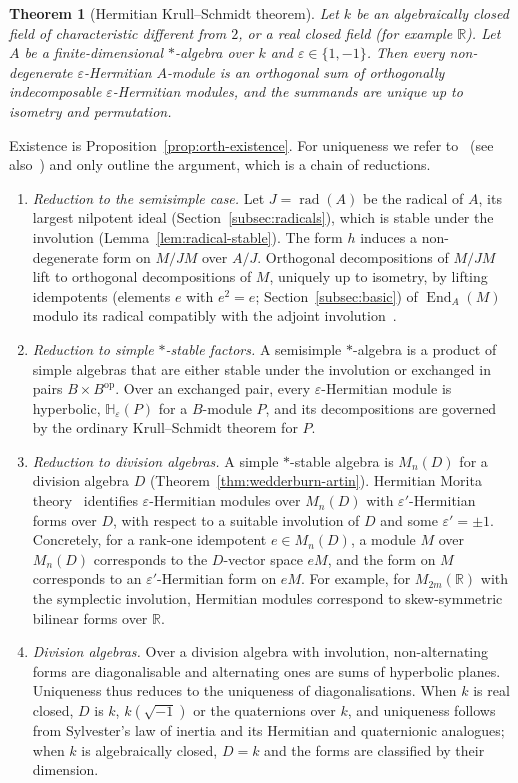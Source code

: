 \documentclass[12pt, a4paper]{report}
\theoremstyle{plain}
\newtheorem{theorem}{Theorem}[chapter]
\theoremstyle{definition}
\theoremstyle{remark}
\theoremstyle{plain}
\newcommand{\rad}[0]{\operatorname{rad}} %
\newcommand{\RR}{\mathbb{R}}
\DeclareMathOperator{\End}{End}
\begin{document}
\begin{theorem}[Hermitian Krull--Schmidt theorem]\label{thm:hermitian-ks}
Let $k$ be an algebraically closed field of characteristic different from $2$, or a real closed field (for example $\RR$). Let $A$ be a finite-dimensional $*$-algebra over $k$ and $\varepsilon\in\{1,-1\}$. Then every non-degenerate $\varepsilon$-Hermitian $A$-module is an orthogonal sum of orthogonally indecomposable $\varepsilon$-Hermitian modules, and the summands are unique up to isometry and permutation.
\end{theorem}

Existence is Proposition~\ref{prop:orth-existence}. For uniqueness we refer to~\cite{QuebbemannScharlauSchulte1979,Sergeichuk1988} (see also~\cite{Wall1976,Knus1991,Lorand2020}) and only outline the argument, which is a chain of reductions.
\begin{enumerate}
  \item \emph{Reduction to the semisimple case.} Let $J=\rad(A)$ be the radical of $A$, its largest nilpotent ideal (Section~\ref{subsec:radicals}), which is stable under the involution (Lemma~\ref{lem:radical-stable}). The form $h$ induces a non-degenerate form on $M/JM$ over $A/J$. Orthogonal decompositions of $M/JM$ lift to orthogonal decompositions of $M$, uniquely up to isometry, by lifting idempotents (elements $e$ with $e^2=e$; Section~\ref{subsec:basic}) of $\End_A(M)$ modulo its radical compatibly with the adjoint involution~\cite{QuebbemannScharlauSchulte1979}.
  \item \emph{Reduction to simple $*$-stable factors.} A semisimple $*$-algebra is a product of simple algebras that are either stable under the involution or exchanged in pairs $B\times B^{\mathrm{op}}$. Over an exchanged pair, every $\varepsilon$-Hermitian module is hyperbolic, $\mathbb{H}_\varepsilon(P)$ for a $B$-module $P$, and its decompositions are governed by the ordinary Krull--Schmidt theorem for $P$.
  \item \emph{Reduction to division algebras.} A simple $*$-stable algebra is $M_n(D)$ for a division algebra $D$ (Theorem~\ref{thm:wedderburn-artin}). Hermitian Morita theory~\cite[Ch.~I, \S9]{Knus1991} identifies $\varepsilon$-Hermitian modules over $M_n(D)$ with $\varepsilon'$-Hermitian forms over $D$, with respect to a suitable involution of $D$ and some $\varepsilon'=\pm1$. Concretely, for a rank-one idempotent $e\in M_n(D)$, a module $M$ over $M_n(D)$ corresponds to the $D$-vector space $eM$, and the form on $M$ corresponds to an $\varepsilon'$-Hermitian form on $eM$. For example, for $M_{2m}(\RR)$ with the symplectic involution, Hermitian modules correspond to skew-symmetric bilinear forms over $\RR$.
  \item \emph{Division algebras.} Over a division algebra with involution, non-alternating forms are diagonalisable and alternating ones are sums of hyperbolic planes. Uniqueness thus reduces to the uniqueness of diagonalisations. When $k$ is real closed, $D$ is $k$, $k(\sqrt{-1})$ or the quaternions over $k$, and uniqueness follows from Sylvester's law of inertia and its Hermitian and quaternionic analogues; when $k$ is algebraically closed, $D=k$ and the forms are classified by their dimension.
\end{enumerate}
\end{document}

